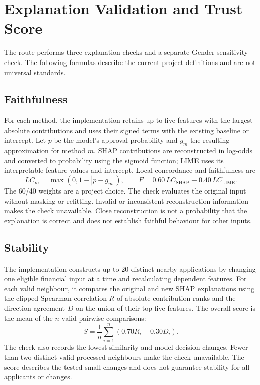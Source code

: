 \section{Explanation Validation and Trust Score}
The route performs three explanation checks and a separate Gender-sensitivity check. The following formulas describe the current project definitions and are not universal standards.

\subsection{Faithfulness}
For each method, the implementation retains up to five features with the largest absolute contributions and uses their signed terms with the existing baseline or intercept. Let $p$ be the model's approval probability and $g_m$ the resulting approximation for method $m$. SHAP contributions are reconstructed in log-odds and converted to probability using the sigmoid function; LIME uses its interpretable feature values and intercept. Local concordance and faithfulness are
\begin{equation}
 LC_m=\max(0,1-|p-g_m|),\qquad
 F=0.60\,LC_{\mathrm{SHAP}}+0.40\,LC_{\mathrm{LIME}}.
 \label{eq:faithfulness}
\end{equation}
The 60/40 weights are a project choice. The check evaluates the original input without masking or refitting. Invalid or inconsistent reconstruction information makes the check unavailable. Close reconstruction is not a probability that the explanation is correct and does not establish faithful behaviour for other inputs.

\subsection{Stability}
The implementation constructs up to 20 distinct nearby applications by changing one eligible financial input at a time and recalculating dependent features. For each valid neighbour, it compares the original and new SHAP explanations using the clipped Spearman correlation $R$ of absolute-contribution ranks and the direction agreement $D$ on the union of their top-five features. The overall score is the mean of the $n$ valid pairwise comparisons:
\begin{equation}
  S=\frac{1}{n}\sum_{i=1}^{n}\left(0.70R_i+0.30D_i\right).
\end{equation}
The check also records the lowest similarity and model decision changes. Fewer than two distinct valid processed neighbours make the check unavailable. The score describes the tested small changes and does not guarantee stability for all applicants or changes.

